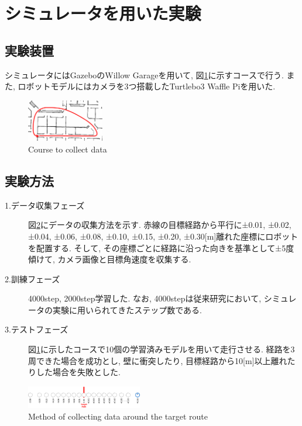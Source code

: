\documentclass[10pt]{ujarticle}
\begin{document}
    \section{シミュレータを用いた実験}%
    \subsection{実験装置}シミュレータにはGazeboのWillow Garageを用いて, 図\ref{Fig:willow}に示すコースで行う. また, ロボットモデルにはカメラを3つ搭載したTurtlebo3 Waffle Piを用いた. 

    \begin{figure}[h]
        \centering
        \includegraphics[width=0.3\textwidth]{fig/willow-path.png}
        \caption{Course to collect data}
        \label{Fig:willow}
    \end{figure}

    \subsection{実験方法}
    \begin{description}
        \item[1.データ収集フェーズ]図\ref{Fig:collect-data}にデータの収集方法を示す. 赤線の目標経路から平行に±0.01, ±0.02, ±0.04, ±0.06, ±0.08, ±0.10, ±0.15, ±0.20, ±0.30[m]離れた座標にロボットを配置する. そして, その座標ごとに経路に沿った向きを基準として±5度傾けて, カメラ画像と目標角速度を収集する. 
        \item[2.訓練フェーズ]4000step, 2000step学習した. なお, 4000stepは従来研究において, シミュレータの実験に用いられてきたステップ数である. 
        \item[3.テストフェーズ]図\ref{Fig:willow}に示したコースで10個の学習済みモデルを用いて走行させる. 経路を3周できた場合を成功とし, 壁に衝突したり, 目標経路から10[m]以上離れたりした場合を失敗とした. 
    \end{description}

    \begin{figure}[h]
        \centering
        \includegraphics[width=0.45\textwidth]{fig/collect-data.png}
        \caption{Method of collecting data around the target route}
        \label{Fig:collect-data}
    \end{figure}
\end{document}
